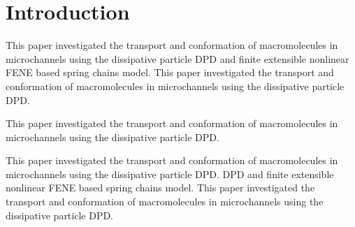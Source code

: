 \section{Introduction}\label{sec:introduction}

This paper investigated the transport and conformation of macromolecules in microchannels using the dissipative particle DPD and finite extensible nonlinear FENE based spring chains model.  This paper investigated the transport and conformation of macromolecules in microchannels using the dissipative particle DPD\cite{Chun1999Fabrication,Fan2003Microchannel}.  

This paper investigated the transport and conformation of macromolecules in microchannels using the dissipative particle DPD.  

This paper investigated the transport and conformation of macromolecules in microchannels using the dissipative particle DPD.  DPD and finite extensible nonlinear FENE based spring chains model. This paper investigated the transport and conformation of macromolecules in microchannels using the dissipative particle DPD.
